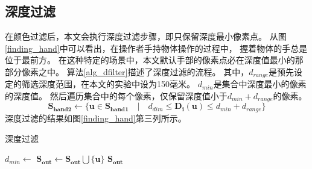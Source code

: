 \subsection{深度过滤}
在颜色过滤后，本文会执行深度过滤步骤，即只保留深度最小像素点。
从图\ref{finding_hand}中可以看出，在操作者手持物体操作的过程中，
握着物体的手总是位于最前方。
在这种特定的场景中，本文默认手部的像素点必在深度值最小的那部分像素之中。
算法\ref{alg_dfilter}描述了深度过滤的流程。
其中，$d_{range}$是预先设定的筛选深度范围，在本文的实验中设为150毫米。
$d_{min}$是集合中深度最小的像素的深度值。
然后遍历集合中的每个像素，仅保留深度值小于$d_{min}+d_{range}$的像素。
\begin{equation}
    \bm{S_{hand2}} \gets
    \{
    \bm{u} \in \bm{S_{hand1}} \quad
    | \quad
    d_{dim} \leq \bm{D_i}(\bm{u}) \leq d_{min} + d_{range}
    \}
\end{equation}
深度过滤的结果如图\ref{finding_hand}第三列所示。
\begin{algorithm}
    \caption{深度过滤}
    \label{alg_dfilter}
    \begin{algorithmic}[1]
            \State $d_{min} \gets$ 
                    \State $\bm{S_{out}} \gets \bm{S_{out}} \bigcup \{\bm{u}\}$
                \EndIf
            \EndFor
            \State \Return $\bm{S_{out}}$
        \EndFunction
    \end{algorithmic}
\end{algorithm}

